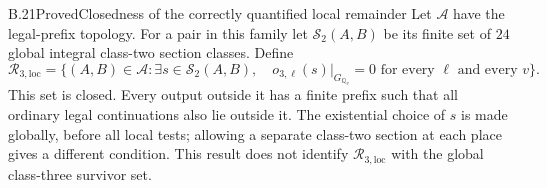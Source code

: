 \begin{result}{B.21}{Proved}{Closedness of the correctly quantified local remainder}
\label{coh:closedlocal}
Let $\mathscr A$ have the legal-prefix topology. For a pair in this
family let $\mathcal S_2(A,B)$ be its finite set of $24$ global integral
class-two section classes. Define
\[
 \mathscr R_{3,\mathrm{loc}}=
 \{(A,B)\in\mathscr A:\exists s\in\mathcal S_2(A,B),\quad
       o_{3,\ell}(s)|_{G_{\mathbb Q_v}}=0
       \text{ for every }\ell\text{ and every }v\}.
\]
This set is closed. Every output outside it has a finite prefix such
that all ordinary legal continuations also lie outside it. The
existential choice of $s$ is made globally, before all local tests;
allowing a separate class-two section at each place gives a different
condition. This result does not identify $\mathscr R_{3,\mathrm{loc}}$
with the global class-three survivor set.
\end{result}
